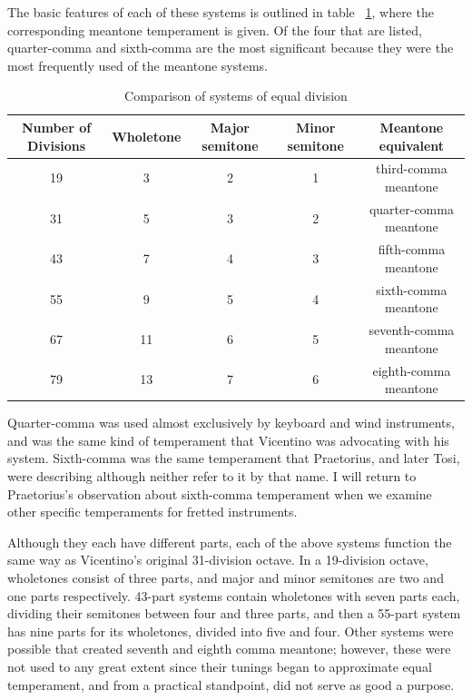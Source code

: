 The basic features of each of these systems is outlined in table
~\ref{table:equalDivision}, where the corresponding meantone temperament is given. Of
the four that are listed, quarter-comma and sixth-comma are the most significant
because they were the most frequently used of the meantone systems.
\begin{table}[h!]
 \begin{center}
 \scalebox{0.7}
 {
  \begin{tabular}{ c c c c c}
   Number of Divisions & Wholetone & Major semitone & Minor semitone & Meantone equivalent \\
   \hline
   19 & 3 & 2 & 1 & third-comma meantone \\
   31 & 5 & 3 & 2 & quarter-comma meantone \\
   43 & 7 & 4 & 3 & fifth-comma meantone \\
   55 & 9 & 5 & 4 & sixth-comma meantone \\
   67 & 11 & 6 & 5 & seventh-comma meantone \\
   79 & 13 & 7 & 6 & eighth-comma meantone \\
  \end{tabular}
 }
 \end{center}
 \caption{Comparison of systems of equal division}
 \label{table:equalDivision}
\end{table}
Quarter-comma was used almost exclusively by keyboard and wind instruments, and was the
same kind of temperament that Vicentino was advocating with his system. Sixth-comma was
the same temperament that Praetorius, and later Tosi, were describing although
neither refer to it by that name. I will return to Praetorius's observation about
sixth-comma temperament when we examine other specific temperaments for fretted
instruments.

Although they each have different parts, each of the above systems function the same way as Vicentino's original
31-division octave. In a 19-division octave, wholetones consist of three parts, and major and minor semitones are two
and one parts respectively. 43-part systems contain wholetones with seven parts each, dividing their semitones between
four and three parts, and then a 55-part system has nine parts for its wholetones, divided into five and four. Other
systems were possible that created seventh and eighth comma meantone; however, these were not used to any great extent
since their tunings began to approximate equal temperament, and from a practical standpoint, did not serve as good a
purpose.

